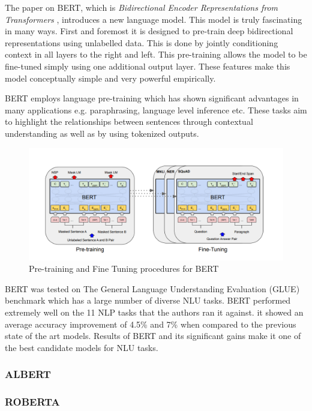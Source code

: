 \documentclass[a4paper,12pt]{report}
\begin{document}
			The paper on BERT, which is \textit{Bidirectional Encoder Representations from Transformers} \citep{bert}, introduces a new language model. This model is truly fascinating in many ways. First and foremost it is designed to pre-train deep bidirectional representations using unlabelled data. This is done by jointly conditioning context in all layers to the right and left. This pre-training allows the model to be fine-tuned simply using one additional output layer. These features make this model conceptually simple and very powerful empirically.

			BERT employs language pre-training \citep{dai} which has shown significant advantages in many applications e.g. paraphrasing, language level inference etc. These tasks aim to highlight the relationships between sentences through contextual understanding as well as by using tokenized outputs.
			\begin{figure}[h!]
				\centering
				\includegraphics[scale=0.35]{../images/BERT.png}
				\caption{Pre-training and Fine Tuning procedures for BERT \citep{bert}}\label{bertPretraining}
			\end{figure}

			BERT was tested on The General Language Understanding Evaluation (GLUE) benchmark \citep{wang} which has a large number of diverse NLU tasks.
			BERT performed extremely well on the 11 NLP tasks that the authors ran it against. it showed an average accuracy improvement of 4.5\% and 7\% when compared to the previous state of the art models. Results of BERT and its significant gains make it one of the best candidate models for NLU tasks.

	       \subsubsection{ALBERT}\label{2322}
	       \cite{albert}

	       \subsubsection{ROBERTA}\label{2323}
	       \cite{roberta}
\end{document}
